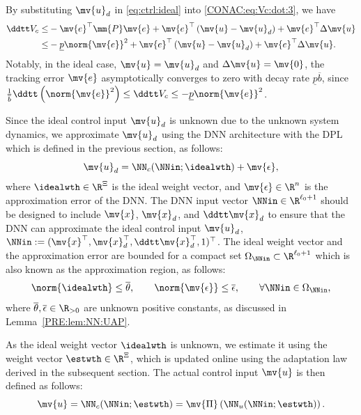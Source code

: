 By substituting $\mv{u}_d$ in \eqref{eq:ctrl:ideal} into \eqref{CONAC:eq:Vc:dot:3}, we have
\begin{align} \label{CONAC:eq:Vc:dot:3} 
  \ddtt V_c
  \le &
  -\mv{e}^\top
  \mm{P}
  \mv{e}
  +
  \mv{e}^\top
  \left(
    \mv{u} 
    - 
    \mv{u}_d
  \right)
  +
  \mv{e}^\top
  \Delta\mv{u}
  \\ \nonumber
  \le & 
  -
  \underline{p}\norm{\mv{e}}^2
  +
  \mv{e}^\top
  \left(
    \mv{u} - \mv{u}_d       
  \right)
  +
  \mv{e}^\top
  \Delta\mv{u}
  .
\end{align}
Notably, in the ideal case, \ie $\mv{u} = \mv{u}_d$ and $\Delta\mv{u} = \mv{0}$, the tracking error $\mv{e}$ asymptotically converges to zero with decay rate $\underline{p}\overline{b}$, since 
$
  \tfrac{1}{\overline{b}}
  \ddtt
  \left(
    \norm{\mv{e}}^2
  \right)
  \le
  \ddtt V_c 
  \le 
  -\underline{p}\norm{\mv{e}}^2
$.

Since the ideal control input $\mv{u}_d$ is unknown due to the unknown system dynamics, we approximate $\mv{u}_d$ using the DNN architecture with the DPL which is defined in the previous section, as follows:
\begin{equation}
  \label{CONAC:eq:ctrl:ideal}
  \mv{u}_d
  =
  \NN_c(\NNin;\idealwth)
  +
  \mv{\epsilon}
  ,
\end{equation}
where $\idealwth\in\R^{\Xi}$ is the ideal weight vector, and $\mv{\epsilon}\in\R^n$ is the approximation error of the DNN.
The DNN input vector $\NNin\in\R^{\ell_0+1}$ should be designed to include $\mv{x}$, $\mv{x}_d$, and $\ddtt\mv{x}_d$ to ensure that the DNN can approximate the ideal control input $\mv{u}_d$, \eg $\NNin:=(\mv{x}^\top,\mv{x}_d^\top,\ddtt\mv{x}_d^\top,1)^\top$.
The ideal weight vector and the approximation error are bounded for a compact set $\Omega_{\NNin}\subset\R^{\ell_0+1}$ which is also known as the approximation region, as follows:
\begin{equation}
  \norm{\idealwth} 
  \le 
  \overline{\theta}
  , 
  \qquad 
  \norm{\mv{\epsilon}} 
  \le 
  \overline{\epsilon}
  , 
  \qquad 
  \forall 
  \NNin\in\Omega_{\NNin}
  ,
\end{equation}
where $\overline{\theta},\overline{\epsilon}\in\R_{>0}$ are unknown positive constants, as discussed in Lemma~\ref{PRE:lem:NN:UAP}.

As the ideal weight vector $\idealwth$ is unknown, we estimate it using the weight vector $\estwth\in\R^{\Xi}$, which is updated online using the adaptation law derived in the subsequent section.
The actual control input $\mv{u}$ is then defined as follows:
\begin{equation}
  \label{CONAC:eq:ctrl:actual}
  \mv{u}
  =
  \NN_c(\NNin;\estwth)
  =
  \mv{\Pi}
  \left(
    \NN_u(\NNin;\estwth)
  \right)
  .
\end{equation}

